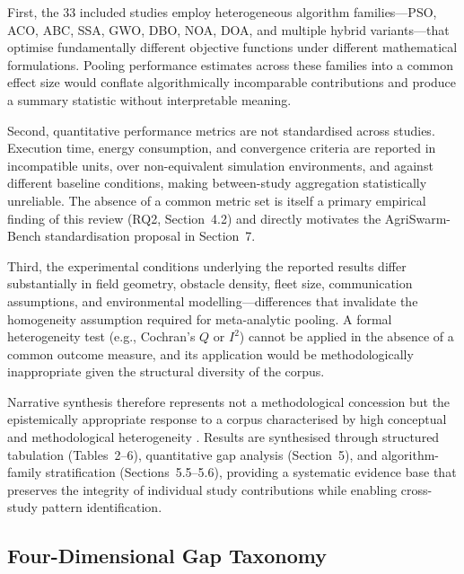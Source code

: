 \documentclass[review,3p,times]{elsarticle}
\begin{document}
First, the 33 included studies employ heterogeneous algorithm families---PSO, ACO, ABC, SSA, GWO, DBO, NOA, DOA, and multiple hybrid variants---that optimise fundamentally different objective functions under different mathematical formulations. Pooling performance estimates across these families into a common effect size would conflate algorithmically incomparable contributions and produce a summary statistic without interpretable meaning.

Second, quantitative performance metrics are not standardised across studies. Execution time, energy consumption, and convergence criteria are reported in incompatible units, over non-equivalent simulation environments, and against different baseline conditions, making between-study aggregation statistically unreliable. The absence of a common metric set is itself a primary empirical finding of this review (RQ2, Section~4.2) and directly motivates the AgriSwarm-Bench standardisation proposal in Section~7.

Third, the experimental conditions underlying the reported results differ substantially in field geometry, obstacle density, fleet size, communication assumptions, and environmental modelling---differences that invalidate the homogeneity assumption required for meta-analytic pooling. A formal heterogeneity test (e.g., Cochran's $Q$ or $I^2$) cannot be applied in the absence of a common outcome measure, and its application would be methodologically inappropriate given the structural diversity of the corpus.

Narrative synthesis therefore represents not a methodological concession but the epistemically appropriate response to a corpus characterised by high conceptual and methodological heterogeneity \cite{page2021,brambilla2013}. Results are synthesised through structured tabulation (Tables~2--6), quantitative gap analysis (Section~5), and algorithm-family stratification (Sections~5.5--5.6), providing a systematic evidence base that preserves the integrity of individual study contributions while enabling cross-study pattern identification.

\subsection{Four-Dimensional Gap Taxonomy}
\end{document}
